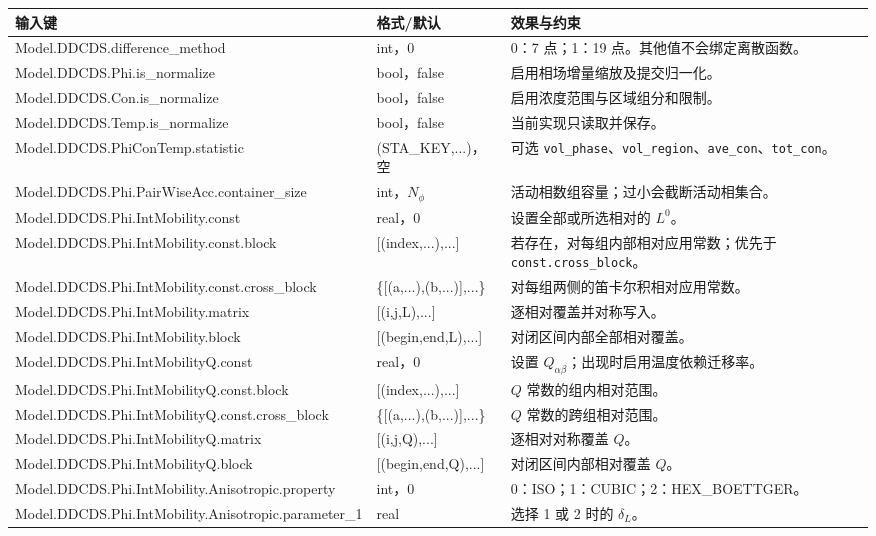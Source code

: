 \documentclass[UTF8,a4paper,11pt]{ctexart}
\newcommand{\code}[1]{\texttt{#1}}
\begin{document}
\begin{longtable}{>{\ttfamily}p{}p{}p{}}
\toprule
\normalfont 输入键 & 格式/默认 & 效果与约束\\
\midrule
\endhead
Model.DDCDS.difference\_method & int，0 & 0：7 点；1：19 点。其他值不会绑定离散函数。\\
Model.DDCDS.Phi.is\_normalize & bool，false & 启用相场增量缩放及提交归一化。\\
Model.DDCDS.Con.is\_normalize & bool，false & 启用浓度范围与区域组分和限制。\\
Model.DDCDS.Temp.is\_normalize & bool，false & 当前实现只读取并保存。\\
Model.DDCDS.PhiConTemp.statistic & (STA\_KEY,...)，空 & 可选 \code{vol\_phase}、\code{vol\_region}、\code{ave\_con}、\code{tot\_con}。\\
Model.DDCDS.Phi.PairWiseAcc.container\_size & int，$N_\phi$ & 活动相数组容量；过小会截断活动相集合。\\
Model.DDCDS.Phi.IntMobility.const & real，0 & 设置全部或所选相对的 $L^0$。\\
Model.DDCDS.Phi.IntMobility.const.block & [(index,...),...] & 若存在，对每组内部相对应用常数；优先于 \code{const.cross\_block}。\\
Model.DDCDS.Phi.IntMobility.const.cross\_block & \{[(a,...),(b,...)],...\} & 对每组两侧的笛卡尔积相对应用常数。\\
Model.DDCDS.Phi.IntMobility.matrix & [(i,j,L),...] & 逐相对覆盖并对称写入。\\
Model.DDCDS.Phi.IntMobility.block & [(begin,end,L),...] & 对闭区间内部全部相对覆盖。\\
Model.DDCDS.Phi.IntMobilityQ.const & real，0 & 设置 $Q_{\alpha\beta}$；出现时启用温度依赖迁移率。\\
Model.DDCDS.Phi.IntMobilityQ.const.block & [(index,...),...] & $Q$ 常数的组内相对范围。\\
Model.DDCDS.Phi.IntMobilityQ.const.cross\_block & \{[(a,...),(b,...)],...\} & $Q$ 常数的跨组相对范围。\\
Model.DDCDS.Phi.IntMobilityQ.matrix & [(i,j,Q),...] & 逐相对对称覆盖 $Q$。\\
Model.DDCDS.Phi.IntMobilityQ.block & [(begin,end,Q),...] & 对闭区间内部相对覆盖 $Q$。\\
Model.DDCDS.Phi.IntMobility.Anisotropic.property & int，0 & 0：ISO；1：CUBIC；2：HEX\_BOETTGER。\\
Model.DDCDS.Phi.IntMobility.Anisotropic.parameter\_1 & real & 选择 1 或 2 时的 $\delta_L$。\\

\end{longtable}
\end{document}
